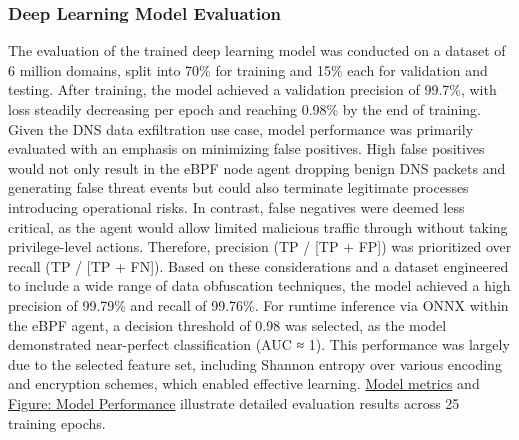 \documentclass [11pt, proquest] {uwthesis}[2020/02/24]
\begin{document}
\subsubsection{Deep Learning Model Evaluation}
The evaluation of the trained deep learning model was conducted on a dataset of 6 million domains, split into 70\% for training and 15\% each for validation and testing. After training, the model achieved a validation precision of 99.7\%, with loss steadily decreasing per epoch and reaching 0.98\% by the end of training. Given the DNS data exfiltration use case, model performance was primarily evaluated with an emphasis on minimizing false positives. High false positives would not only result in the eBPF node agent dropping benign DNS packets and generating false threat events but could also terminate legitimate  processes introducing operational risks. In contrast, false negatives were deemed less critical, as the agent would allow limited malicious traffic through without taking privilege-level actions. Therefore, precision (TP / [TP + FP]) was prioritized over recall (TP / [TP + FN]). Based on these considerations and a dataset engineered to include a wide range of data obfuscation techniques, the model achieved a high precision of 99.79\% and recall of 99.76\%. For runtime inference via ONNX within the eBPF agent, a decision threshold of 0.98 was selected, as the model demonstrated near-perfect classification (AUC ≈ 1). This performance was largely due to the selected feature set, including Shannon entropy over various encoding and encryption schemes, which enabled effective learning. \hyperref[model_metrics]{Model metrics} and \hyperref[fig:model_metrics_quadrant]{Figure: Model Performance} illustrate detailed evaluation results across 25 training epochs.
\end{document}
